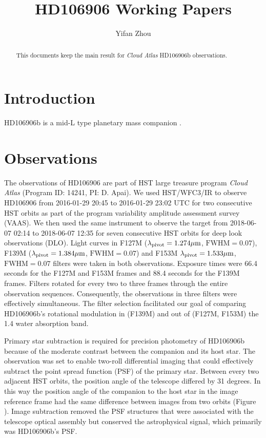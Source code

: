 \documentclass[modern]{aastex62}
\begin{document}
\title{HD106906 Working Papers}


\author{Yifan Zhou}

\begin{abstract}
  This documents keep the main result for \emph{Cloud Atlas} HD106906b \citep{Bailey2013} observations.
\end{abstract}

\keywords{}
\listoftodos

\section{Introduction}
HD106906b is a mid-L type planetary mass companion \citep{Bailey2013}.

\section{Observations}
The observations of HD106906 are part of HST large treasure program \emph{Cloud Atlas} (Program ID: 14241, PI: D. Apai). We used HST/WFC3/IR to observe HD106906 from 2016-01-29 20:45 to 2016-01-29 23:02 UTC for two consecutive HST orbits as part of the program variability amplitude assessment survey (VAAS). We then used the same instrument to observe the target from 2018-06-07 02:14 to 2018-06-07 12:35 for seven consecutive HST orbits for deep look observations (DLO). Light curves in F127M ($\lambda_{\mathrm{pivot}}=1.274\mbox{$\mu$m}$, $\mathrm{FWHM}=0.07$), F139M ($\lambda_{\mathrm{pivot}}=1.384\mbox{$\mu$m}$, $\mathrm{FWHM}=0.07$) and F153M $\lambda_{\mathrm{pivot}}=1.533\mbox{$\mu$m}$, $\mathrm{FWHM}=0.07$ filters were taken in both observations. Exposure times were 66.4 seconds for the F127M and F153M frames and 88.4 seconds for the F139M frames. Filters rotated for every two to three frames through the entire observation sequences. Consequently, the observations in three filters were effectively simultaneous. The filter selection facilitated our goal of comparing HD106906b's rotational modulation in (F139M) and out of (F127M, F153M) the 1.4 \micron water absorption band.

Primary star subtraction is required for precision photometry of HD106906b because of the moderate contrast between the companion and its host star. The observation was set to enable two-roll differential imaging that could effectively subtract the point spread function (PSF) of the primary star. Between every two adjacent HST orbits, the position angle of the telescope differed by 31 degrees.  In this way the position angle of the companion to the host star in the image reference frame had the same difference between images from two orbits (Figure ). Image subtraction removed the PSF structures that were associated with the telescope optical assembly but conserved the astrophysical signal, which primarily was HD106906b's PSF.
\end{document}
